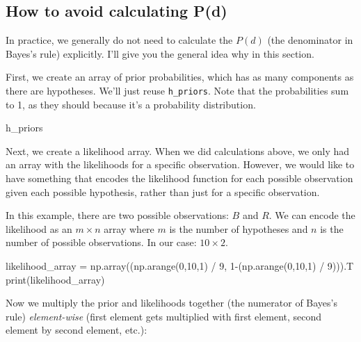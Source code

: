 \documentclass[
  letterpaper,
  DIV=11,
  numbers=noendperiod]{scrreprt}
\newenvironment{Shaded}{\begin{snugshade}}{\end{snugshade}}
\newcommand{\BuiltInTok}[1]{\textcolor[rgb]{0.00,0.23,0.31}{#1}}
\newcommand{\DecValTok}[1]{\textcolor[rgb]{0.68,0.00,0.00}{#1}}
\newcommand{\NormalTok}[1]{\textcolor[rgb]{0.00,0.23,0.31}{#1}}
\newcommand{\OperatorTok}[1]{\textcolor[rgb]{0.37,0.37,0.37}{#1}}
\begin{document}
\subsection{How to avoid calculating P(d)}\label{normalization}

In practice, we generally do not need to calculate the \(P(d)\) (the
denominator in Bayes's rule) explicitly. I'll give you the general idea
why in this section.

First, we create an array of prior probabilities, which has as many
components as there are hypotheses. We'll just reuse \texttt{h\_priors}.
Note that the probabilities sum to 1, as they should because it's a
probability distribution.

\begin{Shaded}
\begin{Highlighting}[]
\NormalTok{h\_priors}
\end{Highlighting}
\end{Shaded}

Next, we create a likelihood array. When we did calculations above, we
only had an array with the likelihoods for a specific observation.
However, we would like to have something that encodes the likelihood
function for each possible observation given each possible hypothesis,
rather than just for a specific observation.

In this example, there are two possible observations: \(B\) and \(R\).
We can encode the likelihood as an \(m \times n\) array where \(m\) is
the number of hypotheses and \(n\) is the number of possible
observations. In our case: \(10 \times 2\).

\begin{Shaded}
\begin{Highlighting}[]
\NormalTok{likelihood\_array }\OperatorTok{=}\NormalTok{ np.array((np.arange(}\DecValTok{0}\NormalTok{,}\DecValTok{10}\NormalTok{,}\DecValTok{1}\NormalTok{) }\OperatorTok{/} \DecValTok{9}\NormalTok{,}
                             \DecValTok{1}\OperatorTok{{-}}\NormalTok{(np.arange(}\DecValTok{0}\NormalTok{,}\DecValTok{10}\NormalTok{,}\DecValTok{1}\NormalTok{) }\OperatorTok{/} \DecValTok{9}\NormalTok{))).T}
\BuiltInTok{print}\NormalTok{(likelihood\_array)}
\end{Highlighting}
\end{Shaded}

Now we multiply the prior and likelihoods together (the numerator of
Bayes's rule) \emph{element-wise} (first element gets multiplied with
first element, second element by second element, etc.):
\end{document}

